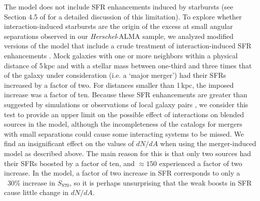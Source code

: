\documentclass[iop]{emulateapj}
\begin{document}

The \citet{HB13} model does not include SFR enhancements induced by starbursts
(see Section 4.5 of \citealt{HB13} for a detailed discussion of this
limitation). To explore whether interaction-induced starbursts are the origin
of the excess at small angular separations observed in our {\it Herschel}-ALMA
sample, we analyzed modified versions of the \citet{HB13} model that include a
crude treatment of interaction-induced SFR enhancements \citep{Miller:2015lr}.
Mock galaxies with one or more neighbors within a physical distance of 5$\,$kpc
and with a stellar mass between one-third and three times that of the galaxy
under consideration (i.e.  a `major merger') had their SFRs increased by a
factor of two. For distances smaller than 1$\,$kpc, the imposed increase was a
factor of ten.  Because these SFR enhancements are greater than suggested by
simulations \citep[e.g.][]{Cox08, H11, H14, Torrey12} or observations of local
galaxy pairs \citep[e.g.][]{Scudder12, Patton13}, we consider this test to
provide an upper limit on the possible effect of interactions on blended
sources in the \citet{HB13} model, although the incompleteness of the
\citet{Behroozi13b} catalogs for mergers with small separations could cause
some interacting systems to be missed.  We find an insignificant effect on the
values of $dN/dA$ when using the merger-induced model as described above.  The
main reason for this is that only two sources had their SFRs boosted by a
factor of ten, and $\approx150$ experienced a factor of two increase. In the
\citet{HB13} model, a factor of two increase in SFR corresponds to only a ~30\%
increase in $S_{870}$, so it is perhaps unsurprising that the weak boosts in
SFR cause little change in $dN/dA$.
\end{document}
